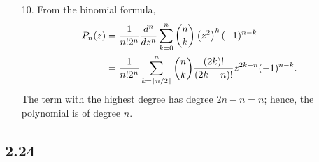 \documentclass[a4paper,12pt]{article}
\begin{document}
\begin{enumerate}
    \item[10.]
        From the binomial formula,
        \begin{align*}
            P_n(z) &= \frac{1}{n! 2^n} \frac{d^n}{dz^n} \sum_{k = 0}^n \dbinom{n}{k} \left( z^2 \right)^k (-1)^{n - k} \\
            &= \frac{1}{n! 2^n} \sum_{k = \lceil n/2 \rceil}^n \dbinom{n}{k} \frac{(2k)!}{(2k - n)!} z^{2k - n} (-1)^{n - k}.
        \end{align*}
        The term with the highest degree has degree $2n - n = n$; hence, the polynomial is of degree $n$.
\end{enumerate}

\subsection*{2.24}
\end{document}
